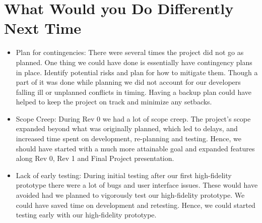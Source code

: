 \documentclass{article}
\begin{document}
\section{What Would you Do Differently Next Time}
\begin{itemize}
    \item Plan for contingencies: There were several times the project did not go as planned. One thing we could have done is essentially have contingency plans in place. Identify potential risks and plan for how to mitigate them. Though a part of it was done while planning we did not account for our developers falling ill or unplanned conflicts in timing. Having a backup plan could have helped to keep the project on track and minimize any setbacks.
    \item Scope Creep: During Rev 0 we had a lot of scope creep. The project's scope expanded beyond what was originally planned, which led to delays, and increased time spent on development, re-planning and testing. Hence, we should have started with a much more attainable goal and expanded features along Rev 0, Rev 1 and Final Project presentation.
    \item Lack of early testing: During initial testing after our first high-fidelity prototype there were a lot of bugs and user interface issues. These would have avoided had we planned to vigorously test our high-fidelity prototype. We could have saved time on development and retesting. Hence, we could started testing early with our high-fidelity prototype.
\end{itemize}
\end{document}
